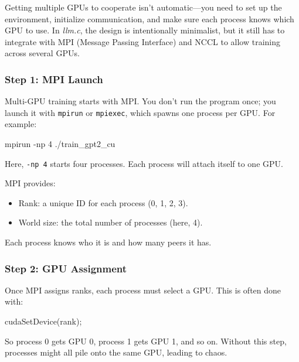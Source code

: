 \documentclass[
  letterpaper,
  DIV=11,
  numbers=noendperiod]{scrreprt}
\newenvironment{Shaded}{\begin{snugshade}}{\end{snugshade}}
\newcommand{\AttributeTok}[1]{\textcolor[rgb]{0.40,0.45,0.13}{#1}}
\newcommand{\ExtensionTok}[1]{\textcolor[rgb]{0.00,0.23,0.31}{#1}}
\newcommand{\NormalTok}[1]{\textcolor[rgb]{0.00,0.23,0.31}{#1}}
\newcommand{\OperatorTok}[1]{\textcolor[rgb]{0.37,0.37,0.37}{#1}}
\providecommand{\tightlist}{%
  \setlength{\itemsep}{0pt}\setlength{\parskip}{0pt}}
\begin{document}
Getting multiple GPUs to cooperate isn't automatic---you need to set up
the environment, initialize communication, and make sure each process
knows which GPU to use. In \emph{llm.c}, the design is intentionally
minimalist, but it still has to integrate with MPI (Message Passing
Interface) and NCCL to allow training across several GPUs.

\subsubsection{Step 1: MPI Launch}\label{step-1-mpi-launch}

Multi-GPU training starts with MPI. You don't run the program once; you
launch it with \texttt{mpirun} or \texttt{mpiexec}, which spawns one
process per GPU. For example:

\begin{Shaded}
\begin{Highlighting}[]
\ExtensionTok{mpirun} \AttributeTok{{-}np}\NormalTok{ 4 ./train\_gpt2\_cu}
\end{Highlighting}
\end{Shaded}

Here, \texttt{-np\ 4} starts four processes. Each process will attach
itself to one GPU.

MPI provides:

\begin{itemize}
\tightlist
\item
  Rank: a unique ID for each process (0, 1, 2, 3).
\item
  World size: the total number of processes (here, 4).
\end{itemize}

Each process knows who it is and how many peers it has.

\subsubsection{Step 2: GPU Assignment}\label{step-2-gpu-assignment}

Once MPI assigns ranks, each process must select a GPU. This is often
done with:

\begin{Shaded}
\begin{Highlighting}[]
\NormalTok{cudaSetDevice}\OperatorTok{(}\NormalTok{rank}\OperatorTok{);}
\end{Highlighting}
\end{Shaded}

So process 0 gets GPU 0, process 1 gets GPU 1, and so on. Without this
step, processes might all pile onto the same GPU, leading to chaos.
\end{document}
